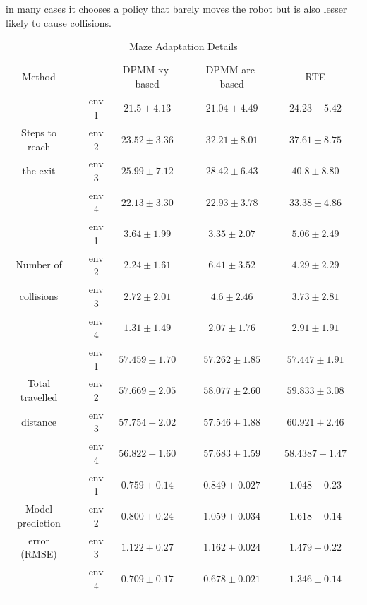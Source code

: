 \documentclass[journal]{IEEEtran}
\begin{document}
in many cases it chooses a policy that barely moves the robot but is also lesser likely to cause collisions.
 






\begin{table}[t!]
\caption{Maze Adaptation Details}
\centering
\begin{tabular}{c c c c c c c c c}
\hline
\addlinespace[0.1cm]
Method         & &       & DPMM xy-based & & DPMM arc-based & & RTE   & \\
\addlinespace[0.1cm]
\hline
\addlinespace[0.1cm]
               & & env 1 & $21.5 \pm 4.13$ & & $21.04 \pm 4.49$ & & $24.23 \pm 5.42$ & \\
Steps to reach & & env 2 & $23.52 \pm 3.36$ & & $32.21 \pm 8.01$ & & $37.61 \pm 8.75$ & \\
 the exit & & env 3 & $25.99 \pm 7.12$ & & $28.42 \pm 6.43$ & & $40.8 \pm 8.80$ & \\
               & & env 4 & $22.13 \pm 3.30$ & &  $22.93 \pm 3.78$ & & $33.38 \pm 4.86$   & \\
\addlinespace[0.1cm]
\hline
%
%
\addlinespace[0.1cm]
               & & env 1 & $3.64 \pm 1.99$ & & $3.35 \pm 2.07$ & & $5.06 \pm 2.49$ & \\
Number of      & & env 2 & $2.24 \pm 1.61$ & & $6.41 \pm 3.52$ & & $4.29 \pm 2.29$ & \\
collisions     & & env 3 & $2.72 \pm 2.01$ & & $4.6 \pm 2.46$ & & $3.73 \pm 2.81$ & \\
               & & env 4 & $1.31 \pm 1.49$ & & $2.07 \pm 1.76$ & & $2.91 \pm 1.91$   & \\
\addlinespace[0.1cm]
\hline
%
%
\addlinespace[0.1cm]
               & & env 1 & $57.459 \pm 1.70$ & & $57.262 \pm 1.85$ & & $57.447 \pm 1.91$ & \\
Total travelled& & env 2 & $57.669 \pm 2.05$ & & $58.077 \pm 2.60$ & & $59.833 \pm 3.08$ & \\
distance       & & env 3 & $57.754 \pm 2.02$ & & $57.546 \pm 1.88$ & & $60.921 \pm 2.46$ & \\
               & & env 4 & $56.822 \pm 1.60$ & & $ 57.683 \pm 1.59 $ & &  $58.4387 \pm 1.47$ & \\
\addlinespace[0.1cm]
\hline
%
%
\addlinespace[0.1cm]
               & & env 1 & $0.759 \pm 0.14$  & & $0.849 \pm 0.027$ & & $1.048 \pm 0.23$ & \\
Model prediction&& env 2 & $0.800 \pm 0.24$ & & $1.059 \pm 0.034$ & & $1.618 \pm 0.14$ & \\
error (RMSE)   & & env 3 & $1.122 \pm 0.27$  & & $1.162 \pm 0.024$ & & $1.479 \pm 0.22$ & \\
               & & env 4 & $0.709 \pm 0.17$ & & $0.678 \pm 0.021$ & & $1.346 \pm 0.14$ & \\
\addlinespace[0.1cm]
\hline
\end{tabular}
\label{detailed_data}
\end{table}
\end{document}
